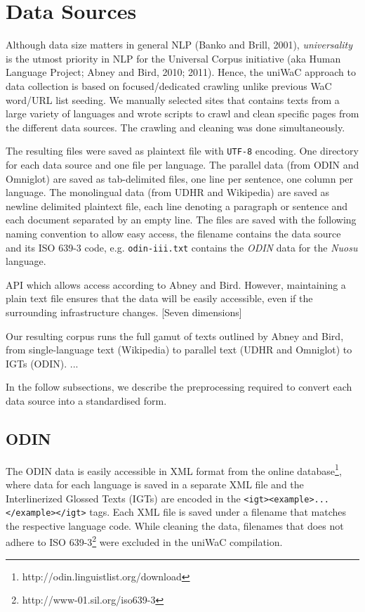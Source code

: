 \documentclass[11pt]{article}
\begin{document}
\section{Data Sources}

Although data size matters in general NLP (Banko and Brill, 2001), \emph{universality} is the utmost priority in NLP for the Universal Corpus initiative (aka Human Language Project; Abney and Bird, 2010; 2011). Hence, the uniWaC approach to data collection is based on focused/dedicated crawling unlike previous WaC word/URL list seeding. We manually selected sites that contains texts from a large variety of languages and wrote scripts to crawl and clean specific pages from the different data sources. The crawling and cleaning was done simultaneously. 

The resulting files were saved as plaintext file with \texttt{UTF-8} encoding. One directory for each data source and one file per language. The parallel data (from ODIN and Omniglot) are saved as tab-delimited files, one line per sentence, one column per language. The monolingual data (from UDHR and Wikipedia) are saved as newline delimited plaintext file, each line denoting a paragraph or sentence and each document separated by an empty line. The files are saved with the following naming convention to allow easy access, the filename contains the data source and its ISO 639-3 code, e.g. \texttt{odin-iii.txt} contains the \emph{ODIN} data for the \emph{Nuosu} language.

API which allows access according to Abney and Bird.  However, maintaining a plain text file ensures that the data will be easily accessible, even if the surrounding infrastructure changes. [Seven dimensions]

Our resulting corpus runs the full gamut of texts outlined by Abney and Bird, from single-language text (Wikipedia) to parallel text (UDHR and Omniglot) to IGTs (ODIN). ...

In the follow subsections, we describe the preprocessing required to convert each data source into a standardised form.

\subsection{ODIN}

The ODIN data is easily accessible in XML format from the online database\footnote{http://odin.linguistlist.org/download}, where data for each language is saved in a separate XML file and the Interlinerized Glossed Texts (IGTs) are encoded in the \texttt{<igt><example>...</example></igt>} tags. Each XML file is saved under a filename that matches the respective language code. While cleaning the data, filenames that does not adhere to ISO 639-3\footnote{http://www-01.sil.org/iso639-3} were excluded in the uniWaC compilation.
\end{document}
